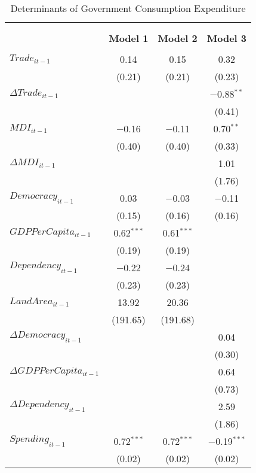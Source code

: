 
\begin{table}[!htbp] \centering 
  \caption{Determinants of Government Consumption Expenditure} 
  \label{} 
\footnotesize 
\begin{tabular}{@{\extracolsep{5pt}}lccc} 
\\[-1.8ex]\hline \\[-1.8ex] 
\\[-1.8ex] & \textbf{Model 1} & \textbf{Model 2} & \textbf{Model 3}\\ 
\hline \\[-1.8ex] 
 $Trade_{it-1}$ & 0.14 & 0.15 & 0.32 \\ 
  & (0.21) & (0.21) & (0.23) \\ 
  $\Delta Trade_{it-1}$ &  &  & $-$0.88$^{**}$ \\ 
  &  &  & (0.41) \\ 
  $MDI_{it-1}$ & $-$0.16 & $-$0.11 & 0.70$^{**}$ \\ 
  & (0.40) & (0.40) & (0.33) \\ 
  $\Delta MDI_{it-1}$ &  &  & 1.01 \\ 
  &  &  & (1.76) \\ 
  $Democracy_{it-1}$ & 0.03 & $-$0.03 & $-$0.11 \\ 
  & (0.15) & (0.16) & (0.16) \\ 
  $GDPPerCapita_{it-1}$ & 0.62$^{***}$ & 0.61$^{***}$ &  \\ 
  & (0.19) & (0.19) &  \\ 
  $Dependency_{it-1}$ & $-$0.22 & $-$0.24 &  \\ 
  & (0.23) & (0.23) &  \\ 
  $LandArea_{it-1}$ & 13.92 & 20.36 &  \\ 
  & (191.65) & (191.68) &  \\ 
  $\Delta Democracy_{it-1}$ &  &  & 0.04 \\ 
  &  &  & (0.30) \\ 
  $\Delta GDPPerCapita_{it-1}$ &  &  & 0.64 \\ 
  &  &  & (0.73) \\ 
  $\Delta Dependency_{it-1}$ &  &  & 2.59 \\ 
  &  &  & (1.86) \\ 
  $Spending_{it-1}$ & 0.72$^{***}$ & 0.72$^{***}$ & $-$0.19$^{***}$ \\ 
  & (0.02) & (0.02) & (0.02) \\ 

\end{tabular}
\end{table}
